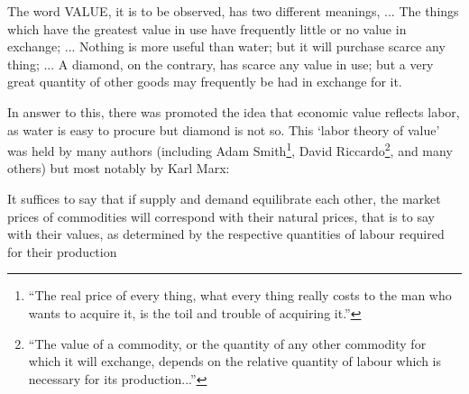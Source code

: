 
\begin{displayquote}
The word VALUE, it is to be observed, has two different meanings, ... The things which have the greatest value in use have frequently little or no value in exchange; ... Nothing is more useful than water; but it will purchase scarce any thing; ... A diamond, on the contrary, has scarce any value in use; but a very great quantity of other goods may frequently be had in exchange for it.\cite{Smith1Gutenberg}
\end{displayquote}

In answer to this, there was promoted the idea that economic value reflects labor, as water is easy to procure but diamond is not so.
This `labor theory of value' was held by many authors (including Adam Smith\footnote{``The real price of every thing, what every thing really costs to the man who wants to acquire it, is the toil and trouble of acquiring it.''\cite{Smith1Gutenberg}}, David Riccardo\footnote{``The value of a commodity, or the quantity of any other commodity for which it will exchange, depends on the relative quantity of labour which is necessary for its production...''\cite[Section 1, Chapter 1]{Riccardo1Gutenberg}}, and many others) but most notably by Karl Marx:

\begin{displayquote}
It suffices to say that if supply and demand equilibrate each other, the market prices of commodities will correspond with their natural prices, that is to say with their values, as determined by the respective quantities of labour required for their production \cite[Chapter 2]{marx1910value}
\end{displayquote}

